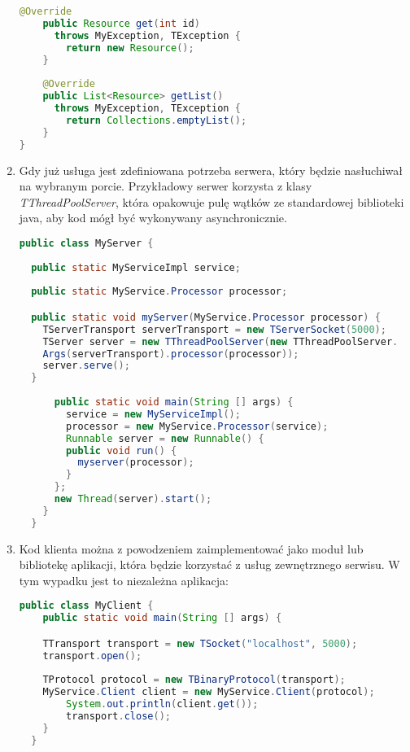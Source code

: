 \begin{enumerate}
\begin{lstlisting}[language=java, caption=Implementacja kodu usługi]
    @Override
    public Resource get(int id) 
      throws MyException, TException {
        return new Resource();
    }
    
    @Override
    public List<Resource> getList() 
      throws MyException, TException {
        return Collections.emptyList();
    }
}
  \end{lstlisting}
  \item Gdy już usługa jest zdefiniowana potrzeba serwera, który będzie nasłuchiwał na wybranym porcie. Przykładowy serwer korzysta z klasy \textit{TThreadPoolServer}, która opakowuje pulę wątków ze standardowej biblioteki java, aby kod mógł być wykonywany asynchronicznie.
        \begin{lstlisting}[language=java, caption=Kod serwera]
public class MyServer {
  
  public static MyServiceImpl service;
  
  public static MyService.Processor processor;

  public static void myServer(MyService.Processor processor) {
    TServerTransport serverTransport = new TServerSocket(5000);
    TServer server = new TThreadPoolServer(new TThreadPoolServer.
    Args(serverTransport).processor(processor));
    server.serve();
  }
  
      public static void main(String [] args) {
        service = new MyServiceImpl();
        processor = new MyService.Processor(service);
        Runnable server = new Runnable() {
        public void run() {
          myserver(processor);
        }
      };
      new Thread(server).start();
    }
  }
  \end{lstlisting}
  \item Kod klienta można z powodzeniem zaimplementować jako moduł lub bibliotekę aplikacji, która będzie korzystać z usług zewnętrznego serwisu. W tym wypadku jest to niezależna aplikacja:
        \begin{lstlisting}[language=java, caption=Kod klienta]
  public class MyClient {
    public static void main(String [] args) {

    TTransport transport = new TSocket("localhost", 5000);
    transport.open();
    
    TProtocol protocol = new TBinaryProtocol(transport);
    MyService.Client client = new MyService.Client(protocol);
        System.out.println(client.get());
        transport.close();
    }
  }
  \end{lstlisting}
\end{enumerate}
